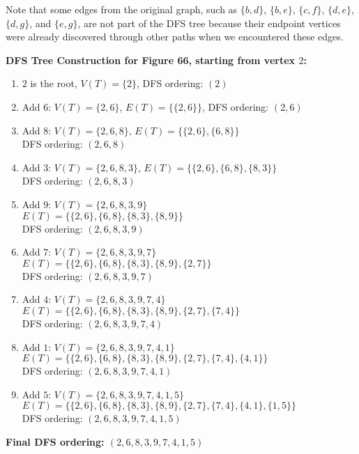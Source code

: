 \documentclass{article}
\theoremstyle{definition}
\begin{document}
Note that some edges from the original graph, such as $\{b, d\}$, $\{b, e\}$, $\{c, f\}$, 
$\{d, e\}$, $\{d, g\}$, and $\{e, g\}$, are not part of the DFS tree because their endpoint vertices 
were already discovered through other paths when we encountered these edges.

\noindent\textbf{DFS Tree Construction for Figure 66, starting from vertex $2$:}
\begin{enumerate}
\item $2$ is the root, $V(T) = \{2\}$, DFS ordering: $(2)$
\item Add $6$: $V(T) = \{2, 6\}$, $E(T) = \{\{2, 6\}\}$, DFS ordering: $(2, 6)$
\item Add $8$: $V(T) = \{2, 6, 8\}$, $E(T) = \{\{2, 6\}, \{6, 8\}\}$\\
   DFS ordering: $(2, 6, 8)$
\item Add $3$: $V(T) = \{2, 6, 8, 3\}$, $E(T) = \{\{2, 6\}, \{6, 8\}, \{8, 3\}\}$\\
   DFS ordering: $(2, 6, 8, 3)$
\item Add $9$: $V(T) = \{2, 6, 8, 3, 9\}$\\
   $E(T) = \{\{2, 6\}, \{6, 8\}, \{8, 3\}, \{8, 9\}\}$\\
   DFS ordering: $(2, 6, 8, 3, 9)$
\item Add $7$: $V(T) = \{2, 6, 8, 3, 9, 7\}$\\
   $E(T) = \{\{2, 6\}, \{6, 8\}, \{8, 3\}, \{8, 9\}, \{2, 7\}\}$\\
   DFS ordering: $(2, 6, 8, 3, 9, 7)$
\item Add $4$: $V(T) = \{2, 6, 8, 3, 9, 7, 4\}$\\
   $E(T) = \{\{2, 6\}, \{6, 8\}, \{8, 3\}, \{8, 9\}, \{2, 7\}, \{7, 4\}\}$\\
   DFS ordering: $(2, 6, 8, 3, 9, 7, 4)$
\item Add $1$: $V(T) = \{2, 6, 8, 3, 9, 7, 4, 1\}$\\
   $E(T) = \{\{2, 6\}, \{6, 8\}, \{8, 3\}, \{8, 9\}, \{2, 7\}, \{7, 4\}, \{4, 1\}\}$\\
   DFS ordering: $(2, 6, 8, 3, 9, 7, 4, 1)$
\item Add $5$: $V(T) = \{2, 6, 8, 3, 9, 7, 4, 1, 5\}$\\
   $E(T) = \{\{2, 6\}, \{6, 8\}, \{8, 3\}, \{8, 9\}, \{2, 7\}, \{7, 4\}, \{4, 1\}, \{1, 5\}\}$\\
   DFS ordering: $(2, 6, 8, 3, 9, 7, 4, 1, 5)$
\end{enumerate}
\textbf {Final DFS ordering: $(2, 6, 8, 3, 9, 7, 4, 1, 5)$}
\end{document}
